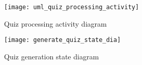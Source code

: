 






\begin{figure}[!ht]
\centering
\texttt{[image: uml\_quiz\_processing\_activity]}
\caption{Quiz processing activity diagram}\label{}
\end{figure}


\begin{figure}[!ht]
\centering
\texttt{[image: generate\_quiz\_state\_dia]}
\caption{Quiz generation state diagram}\label{}
\end{figure}


